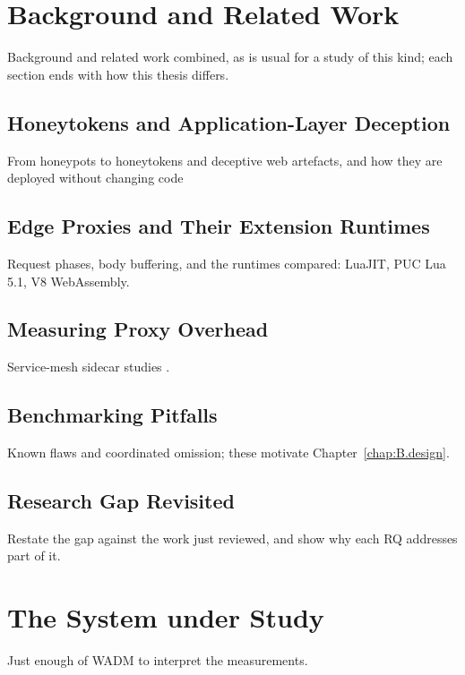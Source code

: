 \documentclass{rptuma}
\begin{document}
\chapter{Background and Related Work}
Background and related work combined, as is usual for a study of this kind; each section ends
with how this thesis differs.

\section{Honeytokens and Application-Layer Deception}
From honeypots to honeytokens and deceptive web artefacts, and how they are deployed without
changing code \cite{spitzner2003honeytokens,bowen2009baiting,juels2013honeywords,virvilis2014changing,kahlhofer2024application}

\section{Edge Proxies and Their Extension Runtimes}
Request phases, body buffering, and the runtimes compared: LuaJIT, PUC Lua 5.1, V8 WebAssembly.

\section{Measuring Proxy Overhead}
Service-mesh sidecar studies \cite{zhu2022dissecting}.

\section{Benchmarking Pitfalls}
Known flaws \cite{vanderkouwe2019sok,heiser_crimes} and coordinated omission; these motivate
Chapter~\ref{chap:B.design}.

\section{Research Gap Revisited}
Restate the gap against the work just reviewed, and show why each RQ addresses part of it.

\chapter{The System under Study}
\label{chap:B.system}
Just enough of WADM to interpret the measurements.
\end{document}
